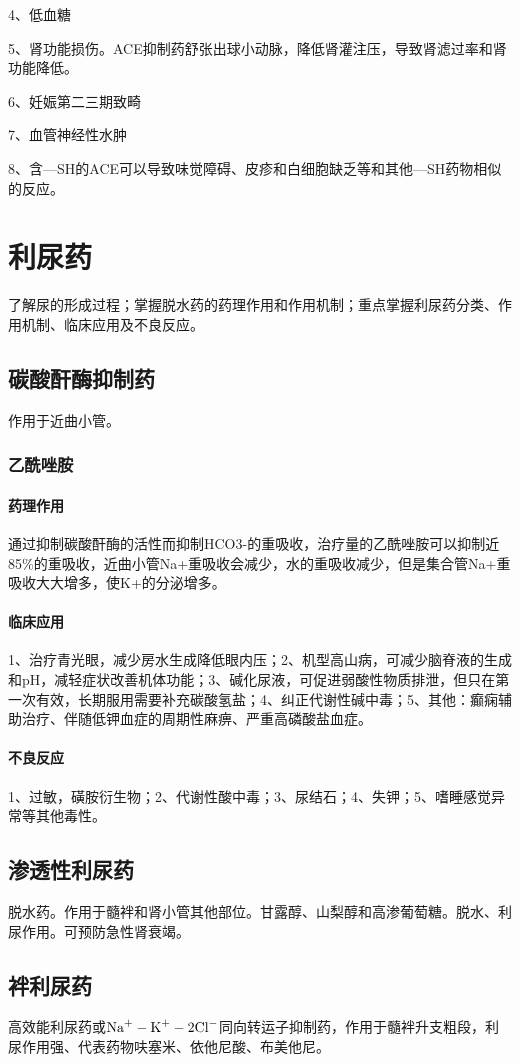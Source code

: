 \documentclass[UTF8]{ctexbook}
\begin{document}
4、低血糖

5、肾功能损伤。ACE抑制药舒张出球小动脉，降低肾灌注压，导致肾滤过率和肾功能降低。

6、妊娠第二三期致畸

7、血管神经性水肿

8、含—SH的ACE可以导致味觉障碍、皮疹和白细胞缺乏等和其他—SH药物相似的反应。
\chapter{利尿药}
了解尿的形成过程；掌握脱水药的药理作用和作用机制；重点掌握利尿药分类、作用机制、临床应用及不良反应。
\section{碳酸酐酶抑制药}作用于近曲小管。
\subsection{乙酰唑胺}
\subsubsection{药理作用}
通过抑制碳酸酐酶的活性而抑制HCO3-的重吸收，治疗量的乙酰唑胺可以抑制近85\%的重吸收，近曲小管Na+重吸收会减少，水的重吸收减少，但是集合管Na+重吸收大大增多，使K+的分泌增多。
\subsubsection{临床应用}
1、治疗青光眼，减少房水生成降低眼内压；2、机型高山病，可减少脑脊液的生成和pH，减轻症状改善机体功能；3、碱化尿液，可促进弱酸性物质排泄，但只在第一次有效，长期服用需要补充碳酸氢盐；4、纠正代谢性碱中毒；5、其他：癫痫辅助治疗、伴随低钾血症的周期性麻痹、严重高磷酸盐血症。
\subsubsection{不良反应}
1、过敏，磺胺衍生物；2、代谢性酸中毒；3、尿结石；4、失钾；5、嗜睡感觉异常等其他毒性。
\section{渗透性利尿药}脱水药。作用于髓袢和肾小管其他部位。甘露醇、山梨醇和高渗葡萄糖。脱水、利尿作用。可预防急性肾衰竭。
\section{袢利尿药}高效能利尿药或\(\textup{Na}^{+}-\textup{K}^{+}-\textup{2Cl}^{-}\)同向转运子抑制药，作用于髓袢升支粗段，利尿作用强、代表药物呋塞米、依他尼酸、布美他尼。
\end{document}
